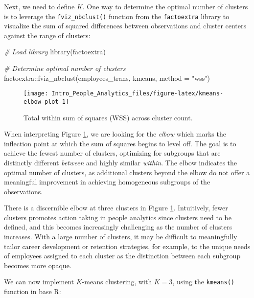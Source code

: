 \documentclass[
]{book}
\newenvironment{Shaded}{\begin{snugshade}}{\end{snugshade}}
\newcommand{\AttributeTok}[1]{\textcolor[rgb]{0.77,0.63,0.00}{#1}}
\newcommand{\CommentTok}[1]{\textcolor[rgb]{0.56,0.35,0.01}{\textit{#1}}}
\newcommand{\FunctionTok}[1]{\textcolor[rgb]{0.00,0.00,0.00}{#1}}
\newcommand{\NormalTok}[1]{#1}
\newcommand{\SpecialCharTok}[1]{\textcolor[rgb]{0.00,0.00,0.00}{#1}}
\newcommand{\StringTok}[1]{\textcolor[rgb]{0.31,0.60,0.02}{#1}}
\begin{document}
Next, we need to define \(K\). One way to determine the optimal number of clusters is to leverage the \texttt{fviz\_nbclust()} function from the \texttt{factoextra} library to visualize the sum of squared differences between observations and cluster centers against the range of clusters:

\begin{Shaded}
\begin{Highlighting}[]
\CommentTok{\# Load library}
\FunctionTok{library}\NormalTok{(factoextra)}

\CommentTok{\# Determine optimal number of clusters}
\NormalTok{factoextra}\SpecialCharTok{::}\FunctionTok{fviz\_nbclust}\NormalTok{(employees\_trans, kmeans, }\AttributeTok{method =} \StringTok{"wss"}\NormalTok{)}
\end{Highlighting}
\end{Shaded}

\begin{figure}

{\centering \texttt{[image: Intro\_People\_Analytics\_files/figure-latex/kmeans-elbow-plot-1]} 

}

\caption{Total within sum of squares (WSS) across cluster count.}\label{fig:kmeans-elbow-plot}
\end{figure}

When interpreting Figure \ref{fig:kmeans-elbow-plot}, we are looking for the \emph{elbow} which marks the inflection point at which the sum of squares begins to level off. The goal is to achieve the fewest number of clusters, optimizing for subgroups that are distinctly different \emph{between} and highly similar \emph{within}. The elbow indicates the optimal number of clusters, as additional clusters beyond the elbow do not offer a meaningful improvement in achieving homogeneous subgroups of the observations.

There is a discernible elbow at three clusters in Figure \ref{fig:kmeans-elbow-plot}. Intuitively, fewer clusters promotes action taking in people analytics since clusters need to be defined, and this becomes increasingly challenging as the number of clusters increases. With a large number of clusters, it may be difficult to meaningfully tailor career development or retention strategies, for example, to the unique needs of employees assigned to each cluster as the distinction between each subgroup becomes more opaque.

We can now implement \(K\)-means clustering, with \(K = 3\), using the \texttt{kmeans()} function in base R:
\end{document}
